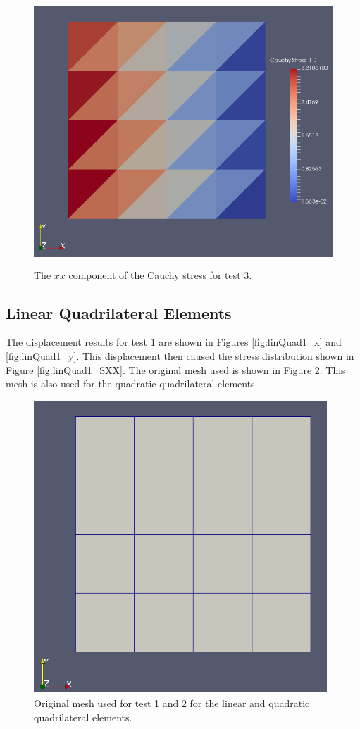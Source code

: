 \documentclass[a4paper, 12pt]{article}
\begin{document}
\begin{figure}[H]
  \centering
  \includegraphics[width=13cm, height=10cm]{Qtri_4_t3_Sxx}
  \caption{The $xx$ component of the Cauchy stress for test 3.}
  \label{fig:quadTri3_SXX}
\end{figure}

\subsection{Linear Quadrilateral Elements} \label{subsec:linQuads}
The displacement results for test 1 are shown in 
Figures \ref{fig:linQuad1_x} and \ref{fig:linQuad1_y}.
This displacement then caused the stress distribution 
shown in Figure \ref{fig:linQuad1_SXX}.
The original mesh used is shown in Figure \ref{fig:QuadMesh}.
This mesh is also used for the quadratic quadrilateral elements.

\begin{figure}[H]
  \centering
  \includegraphics[width=11cm, height=11cm]{quad_4_mesh}
  \caption{Original mesh used for test 1 and 2 for the linear
            and quadratic quadrilateral elements.}
  \label{fig:QuadMesh}
\end{figure}
\end{document}
